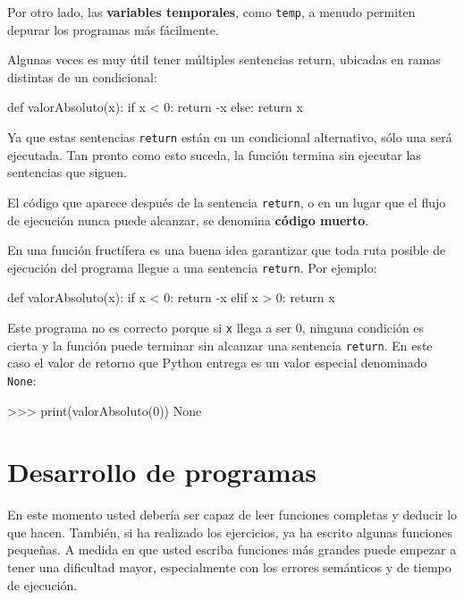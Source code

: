 Por otro lado, las \textbf{variables temporales}, como \texttt{temp},
a menudo permiten depurar los programas más fácilmente.

 

Algunas veces es muy útil tener múltiples sentencias return, ubicadas
en ramas distintas de un condicional:

\begin{pythoncode}
def valorAbsoluto(x):
  if x < 0:
    return -x
  else:
    return x
\end{pythoncode}

Ya que estas sentencias \texttt{return} están en un condicional alternativo,
sólo una será ejecutada. Tan pronto como esto suceda, la función termina
sin ejecutar las sentencias que siguen.

El código que aparece después de la sentencia \texttt{return}, o en
un lugar que el flujo de ejecución nunca puede alcanzar, se denomina
\textbf{código muerto}.


En una función fructífera es una buena idea garantizar que toda ruta
posible de ejecución del programa llegue a una sentencia \texttt{return}.
Por ejemplo:

\begin{pythoncode}
def valorAbsoluto(x):
  if x < 0:
    return -x
  elif x > 0:
    return x
\end{pythoncode}
 Este programa no es correcto porque si \texttt{x} llega a ser 0,
ninguna condición es cierta y la función puede terminar sin alcanzar
una sentencia \texttt{return}. En este caso el valor de retorno que
Python entrega es un valor especial denominado \texttt{None}:

\begin{pyconcode}
>>> print(valorAbsoluto(0))
None
\end{pyconcode}

\section{Desarrollo de programas}

\label{program development} 

En este momento usted debería ser capaz de leer funciones completas
y deducir lo que hacen. También, si ha realizado los ejercicios, ya
ha escrito algunas funciones pequeñas. A medida en que usted escriba
funciones más grandes puede empezar a tener una dificultad mayor,
especialmente con los errores semánticos y de tiempo de ejecución.

